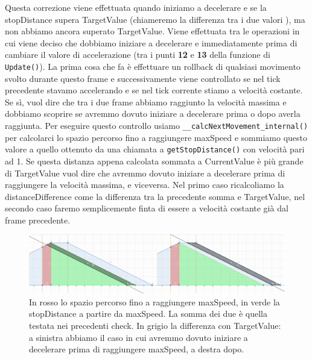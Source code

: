 \documentclass[main.tex]{subfiles}
\begin{document}
\noindent Questa correzione viene effettuata quando iniziamo a decelerare e se la stopDistance supera TargetValue (chiameremo la differenza tra i due valori ), ma non abbiamo ancora superato TargetValue. Viene effettuata tra le operazioni in cui viene deciso che dobbiamo iniziare a decelerare e immediatamente prima di cambiare il valore di accelerazione (tra i punti \textbf{12} e \textbf{13} della funzione di \lstinline{Update()}). La prima cosa che fa è effettuare un rollback di qualsiasi movimento svolto durante questo frame e successivamente viene controllato se nel tick precedente stavamo accelerando e se nel tick corrente stiamo a velocità costante. Se sì, vuol dire che tra i due frame abbiamo raggiunto la velocità massima e dobbiamo scoprire se avremmo dovuto iniziare a decelerare prima o dopo averla raggiunta. Per eseguire questo controllo usiamo \lstinline{__calcNextMovement_internal()} per calcolarci lo spazio percorso fino a raggiungere maxSpeed e sommiamo questo valore a quello ottenuto da una chiamata a \lstinline{getStopDistance()} con velocità pari ad 1. Se questa distanza appena calcolata sommata a CurrentValue è più grande di TargetValue vuol dire che avremmo dovuto iniziare a decelerare prima di raggiungere la velocità massima, e viceversa. Nel primo caso ricalcoliamo la distanceDifference come la differenza tra la precedente somma e TargetValue, nel secondo caso faremo semplicemente finta di essere a velocità costante già dal frame precedente.
\begin{figure}[H]
    \centering
    \includegraphics[width=1\linewidth]{img/interpolazione/compensateLateCall3Case.png}
    \caption{In rosso lo spazio percorso fino a raggiungere maxSpeed, in verde la stopDistance a partire da maxSpeed. La somma dei due è quella testata nei precedenti check. In grigio la differenza con TargetValue: a sinistra abbiamo il caso in cui avremmo dovuto iniziare a decelerare prima di raggiungere maxSpeed, a destra dopo.}
    \label{fig:4_compensateLateCall3Case}
\end{figure}
\end{document}
